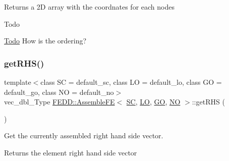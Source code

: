 \begin{DoxyReturn}{Returns}
a 2D array with the coordnates for each nodes 
\end{DoxyReturn}
\begin{DoxyRefDesc}{Todo}
\item[\hyperlink{todo__todo000004}{Todo}]How is the ordering? \end{DoxyRefDesc}
\mbox{\label{classFEDD_1_1AssembleFE_a15f6f643268ff4571437bbb98b7325c5}} 
\subsubsection{\texorpdfstring{get\+R\+H\+S()}{getRHS()}}
{\footnotesize\ttfamily template$<$class SC  = default\+\_\+sc, class LO  = default\+\_\+lo, class GO  = default\+\_\+go, class NO  = default\+\_\+no$>$ \\
vec\+\_\+dbl\+\_\+\+Type \hyperlink{classFEDD_1_1AssembleFE}{F\+E\+D\+D\+::\+Assemble\+FE}$<$ \hyperlink{fe__test__laplace_8cpp_a79c7e86a57edbb2a5a53242bcd04e41e}{SC}, \hyperlink{fe__test__laplace_8cpp_ad6a38c9f07d3fd633eefca5bccad8410}{LO}, \hyperlink{fe__test__laplace_8cpp_afa2946b509009b4f45eb04bd8c5b27d9}{GO}, \hyperlink{fe__test__laplace_8cpp_a5e24f37b28787429872b6ecb1d0417ce}{NO} $>$\+::get\+R\+HS (\begin{DoxyParamCaption}{ }\end{DoxyParamCaption})\hspace{0.3cm}{\ttfamily [inline]}}



Get the currently assembled right hand side vector. 

\begin{DoxyReturn}{Returns}
the element right hand side vector 
\end{DoxyReturn}
\mbox{\label{classFEDD_1_1AssembleFE_a33e83a1eb6656a74609dfbfaf3fae474}} 
